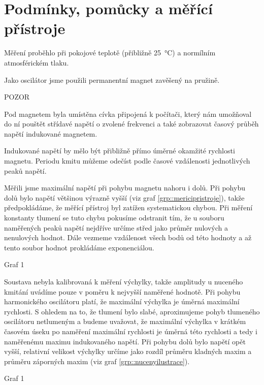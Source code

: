 \section*{Podmínky, pomůcky a měřící přístroje}
Měření proběhlo při pokojové teplotě (přibližně \SI{25}{\degreeCelsius}) a normílním atmosférickém tlaku.

Jako oscilátor jsme použili permanentní magnet zavěšený na pružině.

POZOR

Pod magnetem byla umístěna cívka připojená k počítači, který nám umožňoval do ní pouštět střídavé napětí o zvolené frekvenci a také zobrazovat časový průběh napětí indukované magnetem.



Indukované napětí by mělo být přibližně přímo úměrné okamžité rychlosti magnetu.
Periodu kmitu můžeme odečíst podle časové vzdálenosti jednotlivých peaků napětí.


Měřili jsme maximální napětí při pohybu magnetu nahoru i dolů.
Při pohybu dolů bylo napětí většinou výrazně vyšší (viz graf \ref{grp::mericipristroje}), takže předpokládáme, že měřící přístroj byl zatížen systematickou chybou.
Při měření konstanty tlumení se tuto chybu pokusíme odstranit tím, že u souboru naměřených peaků napětí nejdříve určíme střed jako průměr nulových a nenulových hodnot.
Dále vezmeme vzdálenost všech bodů od této hodnoty a až 
tento soubor hodnot prokládáme exponenciálou.

\begin{graph}[htbp] 
\centering
%
\caption{Graf 1}
\label{grp::mericipristroje}
\end{graph}

Soustava nebyla kalibrovaná k měření výchylky, takže amplitudy u nuceného kmitání uvádíme pouze v poměru k nejvyšší naměřené hodnotě.
Při pohybu harmonického oscilátoru platí, že maximální výchylka je úměrná maximální rychlosti.
S ohledem na to, že tlumení bylo slabé, aproximujeme pohyb tlumeného oscilátoru netlumeným a budeme uvažovat, že maximální výchylka v krátkém časovém úseku po naměření maximální rychlosti je úměrná této rychlosti a tedy i naměřenému maximu indukovaného napětí.
Při pohybu dolů bylo napětí opět vyšší, relativní velikost výchylky určíme jako rozdíl průměru kladných maxim a průměru záporných maxim (viz graf \ref{grp::nucenyilustrace}).

\begin{graph}[htbp] 
\centering
%
\caption{Graf 1}
\label{grp::nucenyilustrace}
\end{graph}